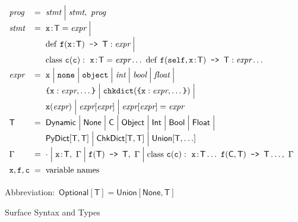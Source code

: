 \documentclass[english,cleveref,submission]{programming}
\makeatletter
\newcommand{\code}[1]{\texttt{#1}}
\newcommand{\defeq}{=}
\newcommand{\langmid}{\mathrel{\mathbf{\Big\vert}}}
\newenvironment{langarray}{\(\def\arraystretch{1.5}\begin{array}{l@{\hspace{2mm}}c@{\hspace{2mm}}l}}{\end{array}\)}
\newcommand{\spann}[2]{#1\!:\!#2}
\newcommand{\typefont}[1]{\mathsf{#1}}
\newcommand{\codefont}[1]{\emph{#1}}
\newcommand{\paramtype}[2]{#1[#2]}
\newcommand{\sptype}{\typefont{T}}
\newcommand{\sptclass}{\typefont{C}}
\newcommand{\sptint}{\typefont{Int}}
\newcommand{\sptbool}{\typefont{Bool}}
\newcommand{\sptfloat}{\typefont{Float}}
\newcommand{\sptdyn}{\typefont{Dynamic}}
\newcommand{\sptobject}{\typefont{Object}}
\newcommand{\sptnone}{\typefont{None}}
\newcommand{\sptoptional}[1]{\paramtype{\typefont{Optional}}{#1}}
\newcommand{\sptunion}[1]{\paramtype{\typefont{Union}}{#1}}
\newcommand{\sptrawpydict}{\typefont{PyDict}}
\newcommand{\sptpydict}[2]{\paramtype{\sptrawpydict}{#1, #2}}
\newcommand{\sptchkdict}[2]{\paramtype{\typefont{ChkDict}}{#1, #2}}
\newcommand{\sptenv}{\Gamma}
\newcommand{\sptenvnil}{\cdot}
\newcommand{\sptvardef}[2]{\spann{#1}{#2}}
\newcommand{\sptfundef}[3]{#1(#2)\code{ -> }#3}
\newcommand{\sptclassdef}[4]{\mathrm{class}~#1(#2):~#3~#4}
\newcommand{\spx}{\code{x}}
\newcommand{\spf}{\code{f}}
\newcommand{\spc}{\code{c}}
\newcommand{\spprog}{\codefont{prog}}
\newcommand{\spstmt}{\codefont{stmt}}
\newcommand{\spexpr}{\codefont{expr}}
\newcommand{\spvardef}[3]{\sptvardef{#1}{#2} = #3}
\newcommand{\spfundef}[4]{\mathrm{def}~#1(#2)\code{ -> }#3: #4}
\newcommand{\spclassdef}[4]{\mathrm{class}~#1(#2):~#3~#4}
\newcommand{\spself}{\code{self}}
\newcommand{\spobject}{\code{object}}
\newcommand{\spnone}{\code{none}}
\newcommand{\spint}{\codefont{int}}
\newcommand{\spbool}{\codefont{bool}}
\newcommand{\spfloat}{\codefont{float}}
\newcommand{\sppydict}[1]{\code{\{}#1\code{\}}}
\newcommand{\spchkdict}[1]{\code{chkdict}(#1)}
\newcommand{\spapp}[2]{#1(#2)}
\newcommand{\spref}[2]{#1[#2]}
\newcommand{\spset}[3]{#1[#2] = #3}
\makeatother
\begin{document}
\begin{figure}[t]
  \begin{langarray}
    \spprog & \defeq &
      \spstmt \langmid \spstmt,~\spprog
  \\
    \spstmt & \defeq &
      \spvardef{\spx}{\sptype}{\spexpr} \langmid
  \\ & &
      \spfundef{\spf}{\spann{\spx}{\sptype}}{\sptype}{\spexpr} \langmid
  \\ & &
      \spclassdef{\spc}{\spc}{\spvardef{\spx}{\sptype}{\spexpr} \ldots}{\spfundef{\spf}{\spself, \spann{\spx}{\sptype}}{\sptype}{\spexpr} \ldots}
  \\
    \spexpr & \defeq &
      \spx \langmid \spnone \langmid \spobject \langmid \spint \langmid \spbool \langmid \spfloat \langmid
  \\ & &
      \sppydict{\spx: \spexpr, \ldots} \langmid
      \spchkdict{\sppydict{\spx: \spexpr, \ldots}} \langmid
  \\ & &
      \spapp{\spx}{\spexpr} \langmid
      \spref{\spexpr}{\spexpr} \langmid
      \spset{\spexpr}{\spexpr}{\spexpr}
  \\
    \sptype & \defeq &
      \sptdyn \langmid
      \sptnone \langmid
      \sptclass \langmid
      \sptobject \langmid
      \sptint \langmid
      \sptbool \langmid
      \sptfloat \langmid
  \\ & &
      \sptpydict{\sptype}{\sptype} \langmid
      \sptchkdict{\sptype}{\sptype} \langmid
      \sptunion{\sptype, \ldots}
  \\
    \sptenv & \defeq &
      \sptenvnil \langmid
      \sptvardef{\spx}{\sptype},~\sptenv \langmid
      \sptfundef{\spf}{\sptype}{\sptype},~\sptenv \langmid
      \sptclassdef{\spc}{\spc}{\sptvardef{\spx}{\sptype} \ldots}{\sptfundef{\spf}{\sptclass, \sptype}{\sptype} \ldots},~\sptenv
  \\
    \spx, \spf, \spc & \defeq & \mbox{variable names}
  \end{langarray}

  \bigskip
    \mbox{Abbreviation: $\sptoptional{\sptype} \defeq \sptunion{\sptnone, \sptype}$}

  \caption{Surface Syntax and Types}
  \label{f:surface-types}
\end{figure}

\end{document}
